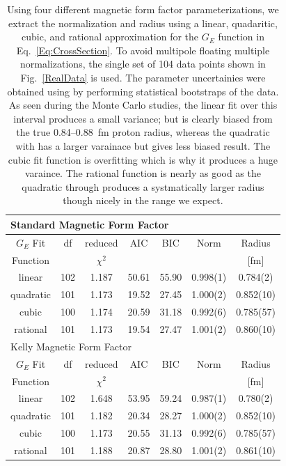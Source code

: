 \documentclass[10pt,aps,prc,twocolumn]{revtex4-1}
\begin{document}
\begin{table}
\caption{Using four different magnetic form factor parameterizations, we extract the normalization
and radius using a linear, quadaritic, cubic, and rational approximation for the $G_E$ function in 
Eq.~\ref{Eq:CrossSection}.
To avoid multipole floating multiple normalizations, the single set of 104 data points 
shown in Fig.~\ref{RealData} is used.
The parameter uncertainies were obtained using by performing statistical bootstraps of the data.
As seen during the Monte Carlo studies, the linear fit over this interval produces a small variance; 
but is clearly biased from the true 0.84--0.88~fm proton radius, whereas the quadratic with has a 
larger varainace but gives less biased result.   The cubic fit function is overfitting which is 
why it produces a huge varaince.   The rational function is nearly as good as the quadratic through
produces a systmatically larger radius though nicely in the range we expect.}
\begin{tabular}{ccccccc} \hline  \hline
\multicolumn{6}{l}{Standard Magnetic Form Factor}      \\  \hline
$G_E$ Fit & df  & reduced   & AIC    & BIC    & Norm & Radius    \\  
Function  &     & $\chi^2$  &        &        &          & [fm]      \\  \hline
linear    & 102 & 1.187     & 50.61  & 55.90  & 0.998(1)    & 0.784(2)   \\
quadratic & 101 & 1.173     & 19.52  & 27.45  & 1.000(2)    & 0.852(10)  \\
cubic     & 100 & 1.174     & 20.59  & 31.18  & 0.992(6)    & 0.785(57)  \\    
rational  & 101 & 1.173     & 19.54  & 27.47  & 1.001(2)    & 0.860(10)    \\    \hline \hline
\multicolumn{6}{l}{Kelly Magnetic Form Factor}      \\  \hline
$G_E$ Fit & df  & reduced   & AIC    & BIC    & Norm & Radius    \\  
Function  &     & $\chi^2$  &        &        &           & [fm]      \\  \hline
linear    & 102 & 1.648     & 53.95  & 59.24  & 0.987(1)  & 0.780(2)   \\
quadratic & 101 & 1.182     & 20.34  & 28.27  & 1.000(2)  & 0.852(10)  \\
cubic     & 100 & 1.173     & 20.55  & 31.13  & 0.992(6)  & 0.785(57)  \\    
rational  & 101 & 1.188     & 20.87  & 28.80  & 1.001(2)  & 0.861(10)    \\    \hline \hline

\end{tabular}
\end{table}
\end{document}

